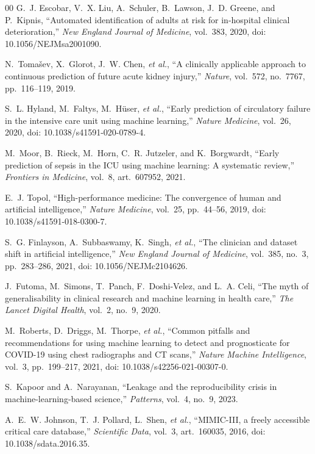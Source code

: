 \documentclass[lettersize,journal]{IEEEtran}
\begin{document}
\begin{thebibliography}{00}
G.~J. Escobar, V.~X. Liu, A.~Schuler, B.~Lawson, J.~D. Greene, and P.~Kipnis,
``Automated identification of adults at risk for in-hospital clinical
deterioration,'' \emph{New England Journal of Medicine}, vol.~383, 2020, doi:
10.1056/NEJMsa2001090.

N.~Toma\v{s}ev, X.~Glorot, J.~W. Chen, \emph{et al.}, ``A clinically applicable
approach to continuous prediction of future acute kidney injury,''
\emph{Nature}, vol.~572, no.~7767, pp.~116--119, 2019.

S.~L. Hyland, M.~Faltys, M.~H\"{u}ser, \emph{et al.}, ``Early prediction of
circulatory failure in the intensive care unit using machine learning,''
\emph{Nature Medicine}, vol.~26, 2020, doi: 10.1038/s41591-020-0789-4.

M.~Moor, B.~Rieck, M.~Horn, C.~R. Jutzeler, and K.~Borgwardt, ``Early prediction
of sepsis in the ICU using machine learning: A systematic review,''
\emph{Frontiers in Medicine}, vol.~8, art.~607952, 2021.

E.~J. Topol, ``High-performance medicine: The convergence of human and
artificial intelligence,'' \emph{Nature Medicine}, vol.~25, pp.~44--56, 2019,
doi: 10.1038/s41591-018-0300-7.

S.~G. Finlayson, A.~Subbaswamy, K.~Singh, \emph{et al.}, ``The clinician and
dataset shift in artificial intelligence,'' \emph{New England Journal of
Medicine}, vol.~385, no.~3, pp.~283--286, 2021, doi: 10.1056/NEJMc2104626.

J.~Futoma, M.~Simons, T.~Panch, F.~Doshi-Velez, and L.~A. Celi, ``The myth of
generalisability in clinical research and machine learning in health care,''
\emph{The Lancet Digital Health}, vol.~2, no.~9, 2020.

M.~Roberts, D.~Driggs, M.~Thorpe, \emph{et al.}, ``Common pitfalls and
recommendations for using machine learning to detect and prognosticate for
COVID-19 using chest radiographs and CT scans,'' \emph{Nature Machine
Intelligence}, vol.~3, pp.~199--217, 2021, doi: 10.1038/s42256-021-00307-0.

S.~Kapoor and A.~Narayanan, ``Leakage and the reproducibility crisis in
machine-learning-based science,'' \emph{Patterns}, vol.~4, no.~9, 2023.

A.~E.~W. Johnson, T.~J. Pollard, L.~Shen, \emph{et al.}, ``MIMIC-III, a freely
accessible critical care database,'' \emph{Scientific Data}, vol.~3,
art.~160035, 2016, doi: 10.1038/sdata.2016.35.


\end{thebibliography}
\end{document}
